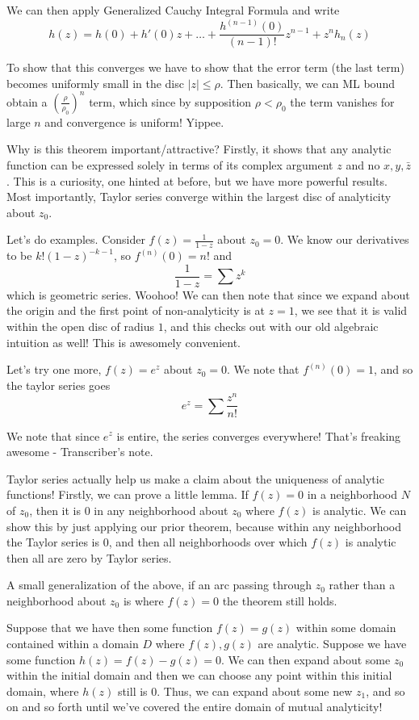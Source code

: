 \documentclass[10pt]{report}
\newcommand{\abs}[1]{\left|#1\right|}
\begin{document}
We can then apply Generalized Cauchy Integral Formula and write
$$h(z) = h(0) + h'(0)z + \dots+ \frac{h^{(n-1)}(0)}{(n-1)!}z^{n-1} + z^n h_n(z)$$

To show that this converges we have to show that the error term (the last term) becomes uniformly small in the disc $\abs{z} \leq \rho$. Then basically, we can ML bound obtain a $\left( \frac{\rho}{\rho_0} \right)^n$ term, which since by supposition $\rho < \rho_0$ the term vanishes for large $n$ and convergence is uniform! Yippee.

Why is this theorem important/attractive? Firstly, it shows that any analytic function can be expressed solely in terms of its complex argument $z$ and no $x,y,\bar{z}$. This is a curiosity, one hinted at before, but we have more powerful results. Most importantly, Taylor series converge within the largest disc of analyticity about $z_0$. 

Let's do examples. Consider $f(z) = \frac{1}{1-z}$ about $z_0 = 0$. We know our derivatives to be $k!(1-z)^{-k-1}$, so $f^{(n)}(0) = n!$ and 
$$\frac{1}{1-z} = \sum z^k$$
which is geometric series. Woohoo! We can then note that since we expand about the origin and the first point of non-analyticity is at $z=1$, we see that it is valid within the open disc of radius $1$, and this checks out with our old algebraic intuition as well! This is awesomely convenient.

Let's try one more, $f(z) = e^z$ about $z_0 = 0$. We note that $f^{(n)}(0) = 1$, and so the taylor series goes
$$e^z = \sum \frac{z^n}{n!}$$

We note that since $e^z$ is entire, the series converges everywhere! That's freaking awesome - Transcriber's note. 

Taylor series actually help us make a claim about the uniqueness of analytic functions! Firstly, we can prove a little lemma. If $f(z) = 0$ in a neighborhood $N$ of $z_0$, then it is $0$ in any neighborhood about $z_0$ where $f(z)$ is analytic. We can show this by just applying our prior theorem, because within any neighborhood the Taylor series is $0$, and then all neighborhoods over which $f(z)$ is analytic then all are zero by Taylor series.

A small generalization of the above, if an arc passing through $z_0$ rather than a neighborhood about $z_0$ is where $f(z) = 0$ the theorem still holds.

Suppose that we have then some function $f(z) = g(z)$ within some domain contained within a domain $D$ where $f(z),g(z)$ are analytic. Suppose we have some function $h(z) = f(z) - g(z) = 0$. We can then expand about some $z_0$ within the initial domain and then we can choose any point within this initial domain, where $h(z)$ still is $0$. Thus, we can expand about some new $z_1$, and so on and so forth until we've covered the entire domain of mutual analyticity!
\end{document}
